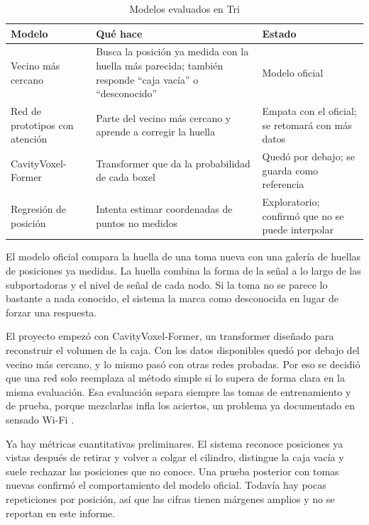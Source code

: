 \documentclass[10pt,journal]{IEEEtran}
\begin{document}
\begin{table}[!t]
\renewcommand{\arraystretch}{1.2}
\caption{Modelos evaluados en Tri}
\label{tab:modelos}
\centering
\footnotesize
\begin{tabular}{@{}>{\raggedright\arraybackslash}p{2.1cm}>{\raggedright\arraybackslash}p{3.2cm}>{\raggedright\arraybackslash}p{2.1cm}@{}}
\toprule
Modelo & Qué hace & Estado \\
\midrule
Vecino más cercano & Busca la posición ya medida con la huella más parecida; también responde ``caja vacía'' o ``desconocido'' & Modelo oficial \\
Red de prototipos con atención & Parte del vecino más cercano y aprende a corregir la huella & Empata con el oficial; se retomará con más datos \\
CavityVoxel-Former & Transformer que da la probabilidad de cada boxel & Quedó por debajo; se guarda como referencia \\
Regresión de posición & Intenta estimar coordenadas de puntos no medidos & Exploratorio; confirmó que no se puede interpolar \\
\bottomrule
\end{tabular}
\end{table}

El modelo oficial compara la huella de una toma nueva con una galería de huellas de posiciones ya medidas. La huella combina la forma de la señal a lo largo de las subportadoras y el nivel de señal de cada nodo. Si la toma no se parece lo bastante a nada conocido, el sistema la marca como desconocida en lugar de forzar una respuesta.

El proyecto empezó con CavityVoxel-Former, un transformer diseñado para reconstruir el volumen de la caja. Con los datos disponibles quedó por debajo del vecino más cercano, y lo mismo pasó con otras redes probadas. Por eso se decidió que una red solo reemplaza al método simple si lo supera de forma clara en la misma evaluación. Esa evaluación separa siempre las tomas de entrenamiento y de prueba, porque mezclarlas infla los aciertos, un problema ya documentado en sensado Wi-Fi \cite{varga2024mitigating}.

Ya hay métricas cuantitativas preliminares. El sistema reconoce posiciones ya vistas después de retirar y volver a colgar el cilindro, distingue la caja vacía y suele rechazar las posiciones que no conoce. Una prueba posterior con tomas nuevas confirmó el comportamiento del modelo oficial. Todavía hay pocas repeticiones por posición, así que las cifras tienen márgenes amplios y no se reportan en este informe.
\end{document}
